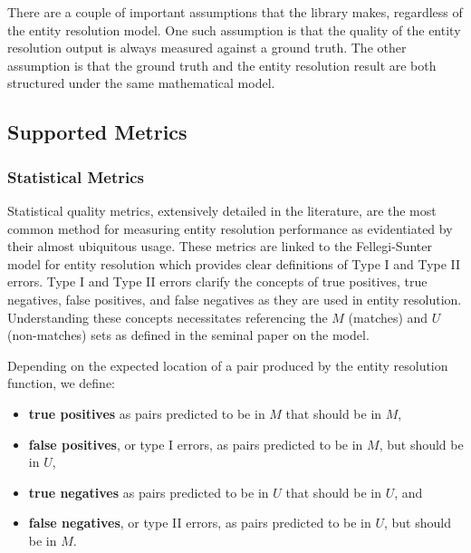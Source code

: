 \documentclass[a4paper,twoside]{article}
\begin{document}
    There are a couple of important assumptions that the library makes,
    regardless of the entity resolution model.
    One such assumption is that the quality of the entity resolution output is
    always measured against a ground truth\cite{manning2008}.
    The other assumption is that the ground truth and the entity resolution
    result are both structured under the same mathematical model.

    \subsection{Supported Metrics}\label{sec:metrics}
    
    \subsubsection{Statistical Metrics}
    Statistical quality metrics, extensively detailed in the
    literature\cite{manning2008,hitesh2012}, are the most common method for
    measuring entity resolution performance as evidentiated by their almost
    ubiquitous usage\cite{fever2009,Goga2015,deepm2020,eager2021}.
    These metrics are linked to the Fellegi-Sunter model for entity resolution
    which provides clear definitions of Type I and Type II
    errors\cite{winkler1990}.
    Type I and Type II errors clarify the concepts of true positives, true
    negatives, false positives, and false negatives as they are used in entity
    resolution.
    Understanding these concepts necessitates referencing the $M$ (matches) and
    $U$ (non-matches) sets as defined in the seminal paper on the model.

    Depending on the expected location of a pair produced by the entity
    resolution function, we define:

    \begin{itemize}
        \item \textbf{true positives} as pairs predicted to be in $M$ that
        should be in $M$,
        \item \textbf{false positives}, or type I errors, as pairs predicted to
        be in $M$, but should be in $U$,
        \item \textbf{true negatives} as pairs predicted to be in $U$ that
        should be in $U$, and
        \item \textbf{false negatives}, or type II errors, as pairs predicted to
        be in $U$, but should be in $M$.
    \end{itemize}
\end{document}
